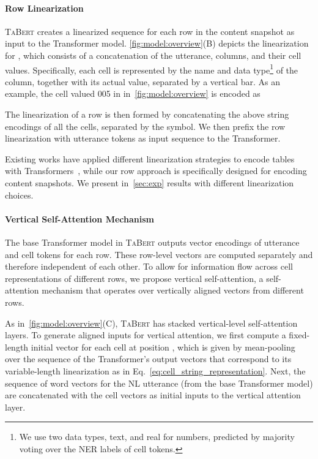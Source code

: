 \documentclass[11pt,a4paper]{article}
\def\model/{\textsc{TaBert}}
\renewcommand{\tt}[1]{\fontfamily{cmtt}\selectfont #1}
\begin{document}
\paragraph{Row Linearization}
\model/ creates a linearized sequence for each row in the content snapshot as input to the Transformer model.
\autoref{fig:model:overview}(B) depicts the linearization for , which consists of a concatenation of the utterance, columns, and their cell values.
Specifically, each cell is represented by the name and data type\footnote{We use two data types, {\tt text}, and {\tt real} for numbers, predicted by majority voting over the NER labels of cell tokens.} of the column, together with its actual value, separated by a vertical bar. 
As an example, the cell  valued {\tt 2005} in  in~\autoref{fig:model:overview} is encoded as

The linearization of a row is then formed by concatenating the above string encodings of all the cells, separated by the {\tt [SEP]} symbol. 
We then prefix the row linearization with utterance tokens as input sequence to the Transformer.


Existing works have applied different linearization strategies to encode tables with Transformers~\cite{Hwang2019ACE,Chen2019TabFactAL}, while our row approach is specifically designed for encoding content snapshots.
We present in~\autoref{sec:exp} results with different linearization choices.

\paragraph{Vertical Self-Attention Mechanism} 
The base Transformer model in \model/ outputs vector encodings of utterance and cell tokens for each row.
These row-level vectors are computed separately and therefore independent of each other.
To allow for information flow across cell representations of different rows, we propose vertical self-attention, a self-attention mechanism that operates over vertically aligned vectors from different rows.

As in~\autoref{fig:model:overview}(C), \model/ has  stacked vertical-level self-attention layers.
To generate aligned inputs for vertical attention, we first compute a fixed-length initial vector for each cell at position , which is given by mean-pooling over the sequence of the Transformer's output vectors that correspond to its variable-length linearization as in Eq.~\eqref{eq:cell_string_representation}.
Next, the sequence of word vectors for the NL utterance (from the base Transformer model) are concatenated with the cell vectors as initial inputs to the vertical attention layer.
\end{document}
